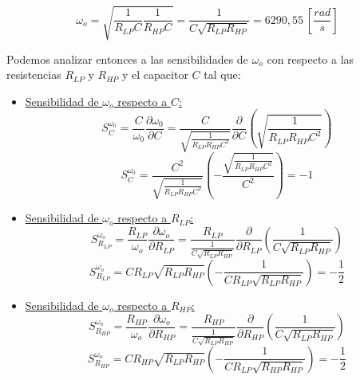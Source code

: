 \documentclass[12pt,a4paper]{article}
\begin{document}
\begin{equation}
    \label{eq_56}
    \omega_o = \sqrt{\frac{1}{R_{LP}C}\frac{1}{R_{HP}C}} = \frac{1}{C\sqrt{R_{LP}R_{HP}}} = 6290,55 \ \left[\frac{rad}{s}\right]
\end{equation}


Podemos analizar entonces a las sensibilidades de $\omega_o$ con respecto a las resistencias $R_{LP}$ y $R_{HP}$ y el capacitor $C$ tal que:

\begin{itemize}
    \item \underline{Sensibilidad de $\omega_o$ respecto a $C$:}
    \begin{equation}
        \label{eq_57}
        S_{C}^{\omega_{0}} = \frac{C}{\omega_{0}}\frac{\partial \omega_{0}}{\partial C} = \frac{C}{\sqrt{\frac{1}{R_{LP}R_{HP}C^2}}}\frac{\partial}{\partial C}\left(\sqrt{\frac{1}{R_{LP}R_{HP}C^2}}\right)
    \end{equation}
    \begin{equation}
        \label{eq_58}
        S_{C}^{\omega_{0}} = \frac{C^{2}}{\sqrt{\frac{1}{R_{LP}R_{HP}C^2}}} \left(-\frac{\sqrt{\frac{1}{R_{LP}R_{HP}C^2}}}{C^2}\right) = - 1
    \end{equation}
    \item \underline{Sensibilidad de $\omega_o$ respecto a $R_{LP}$:}
    \begin{equation}
        \label{eq_59}
            S_{R_{LP}}^{\omega_o} = \frac{R_{LP}}{\omega_{o}} \frac{\partial \omega_{o}}{\partial R_{LP}} = \frac{R_{LP}}{\frac{1}{C\sqrt{R_{LP}R_{HP}}}} \frac{\partial}{\partial R_{LP}} \left(\frac{1}{C\sqrt{R_{LP}R_{HP}}}\right) 
        \end{equation}
        \begin{equation}
            \label{eq_60}
            S_{R_{LP}}^{\omega_o} =  CR_{LP}\sqrt{R_{LP}R_{HP}} \left(-\frac{1}{CR_{LP}\sqrt{R_{LP}R_{HP}}}\right) = - \frac{1}{2} 
        \end{equation}
    \item \underline{Sensibilidad de $\omega_o$ respecto a $R_{HP}$:}
    \begin{equation}
        \label{eq_61}
            S_{R_{HP}}^{\omega_o} = \frac{R_{HP}}{\omega_{o}} \frac{\partial \omega_{o}}{\partial R_{HP}} = \frac{R_{HP}}{\frac{1}{C\sqrt{R_{LP}R_{HP}}}} \frac{\partial}{\partial R_{HP}} \left(\frac{1}{C\sqrt{R_{LP}R_{HP}}}\right) 
        \end{equation}
        \begin{equation}
            \label{eq_62}
            S_{R_{HP}}^{\omega_o} =  CR_{HP}\sqrt{R_{LP}R_{HP}} \left(-\frac{1}{CR_{LP}\sqrt{R_{HP}R_{HP}}}\right) = - \frac{1}{2} 
        \end{equation}
\end{itemize}
\end{document}
